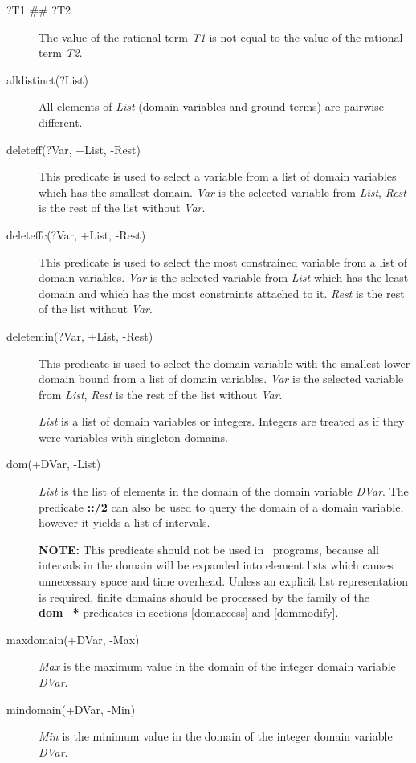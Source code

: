 \begin{description}
\item[?T1 \#\# ?T2]
The value of the rational term {\it T1} is not equal to the value of the
rational term {\it T2}.

\item[alldistinct(?List)]
All elements of {\it List} (domain variables and ground terms) are pairwise
different.

\item[deleteff(?Var, +List, -Rest)]
This predicate is used to select a variable from a list of domain variables
which has the smallest domain.
{\it Var} is the selected variable from {\it List},
{\it Rest} is the rest of the list without {\it Var}.

\item[deleteffc(?Var, +List, -Rest)]
This predicate is used to select the most constrained variable from a list
of domain variables.
{\it Var} is the selected variable from {\it List} which has the least domain
and which has the most constraints attached to it.
{\it Rest} is the rest of the list without {\it Var}.

\item[deletemin(?Var, +List, -Rest)]
This predicate is used to select the domain variable with the smallest
lower domain bound from a list of domain variables.
{\it Var} is the selected variable from {\it List},
{\it Rest} is the rest of the list without {\it Var}.

{\it List} is a list of domain variables or integers. Integers are treated
as if they were variables with singleton domains.

\item[dom(+DVar, -List)]
{\it List} is the list of elements in the domain of the domain variable
{\it DVar}.
The predicate {\bf ::/2} can also be used to query the domain
of a domain variable, however it yields a list of intervals.

{\bf NOTE:} This predicate 
should not be used in \eclipse\ programs, because all intervals
in the domain will be expanded into element lists which causes
unnecessary space and time overhead.
Unless an explicit list representation is required, finite
domains should be processed by the family of the {\bf dom_*}
predicates in sections \ref{domaccess} and \ref{dommodify}.

\item[maxdomain(+DVar, -Max)]
{\it Max} is the maximum value in the domain of the integer domain
variable {\it DVar}.

\item[mindomain(+DVar, -Min)]
{\it Min} is the minimum value in the domain of the integer domain
variable {\it DVar}.

\end{description}

